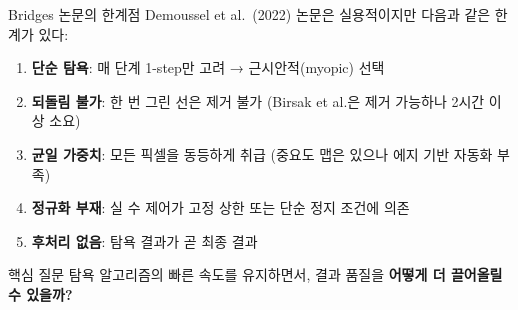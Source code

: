 \documentclass[10pt,aspectratio=169]{beamer}
\begin{document}
\begin{frame}{Bridges 논문의 한계점}
  Demoussel et al.\ (2022) 논문은 실용적이지만 다음과 같은 한계가 있다:

  \vspace{0.3cm}
  \begin{enumerate}
    \item \textbf{단순 탐욕}: 매 단계 1-step만 고려 → 근시안적(myopic) 선택
    \item \textbf{되돌림 불가}: 한 번 그린 선은 제거 불가
          (Birsak et al.은 제거 가능하나 2시간 이상 소요)
    \item \textbf{균일 가중치}: 모든 픽셀을 동등하게 취급
          (중요도 맵은 있으나 에지 기반 자동화 부족)
    \item \textbf{정규화 부재}: 실 수 제어가 고정 상한 또는 단순 정지 조건에 의존
    \item \textbf{후처리 없음}: 탐욕 결과가 곧 최종 결과
  \end{enumerate}

  \vspace{0.3cm}
  \begin{alertblock}{핵심 질문}
    탐욕 알고리즘의 빠른 속도를 유지하면서,
    결과 품질을 \textbf{어떻게 더 끌어올릴 수 있을까?}
  \end{alertblock}
\end{frame}
\end{document}

